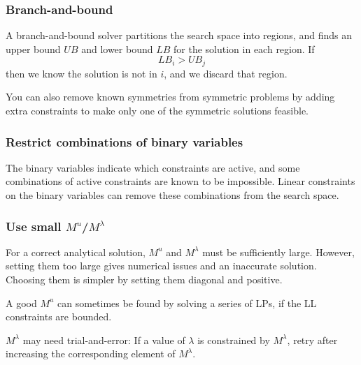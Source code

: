 \subsubsection{Branch-and-bound}
A branch-and-bound solver partitions the search space into regions, and finds an upper bound $UB$ and lower bound $LB$ for the solution in each region. If
%
\begin{equation}
  LB_i > UB_j
\end{equation}
%
then we know the solution is not in $i$, and we discard that region.

You can also remove known symmetries from symmetric problems by adding extra constraints to make only one of the symmetric solutions feasible.

\subsubsection{Restrict combinations of binary variables}
The binary variables indicate which constraints are active, and some combinations of active constraints are known to be impossible. Linear constraints on the binary variables can remove these combinations from the search space.

\subsubsection{Use small $M^u$/$M^\lambda$}
For a correct analytical solution, $M^u$ and $M^\lambda$ must be sufficiently large. However, setting them too large gives numerical issues and an inaccurate solution. Choosing them is simpler by setting them diagonal and positive.

A good $M^u$ can sometimes be found by solving a series of LPs, if the LL constraints are bounded.

$M^\lambda$ may need trial-and-error: If a value of $\lambda$ is constrained by $M^\lambda$, retry after increasing the corresponding element of $M^\lambda$.

